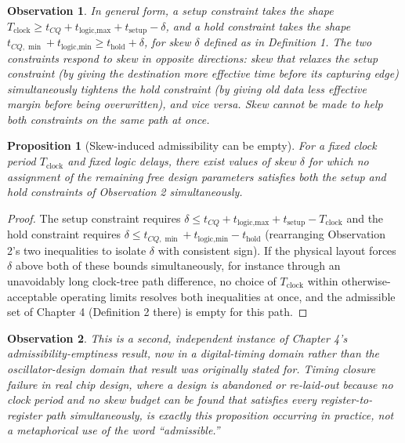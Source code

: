 \documentclass[12pt]{article}
\newtheorem{proposition}{Proposition}
\newtheorem{observation}{Observation}
\begin{document}
\begin{observation}
In general form, a setup constraint takes the shape $T_{\text{clock}} \geq t_{CQ} + t_{\text{logic,max}} + t_{\text{setup}} - \delta$, and a hold constraint takes the shape $t_{CQ,\min} + t_{\text{logic,min}} \geq t_{\text{hold}} + \delta$, for skew $\delta$ defined as in Definition 1. The two constraints respond to skew in opposite directions: skew that relaxes the setup constraint (by giving the destination more effective time before its capturing edge) simultaneously tightens the hold constraint (by giving old data less effective margin before being overwritten), and vice versa. Skew cannot be made to help both constraints on the same path at once.
\end{observation}

\begin{proposition}[Skew-induced admissibility can be empty]
For a fixed clock period $T_{\text{clock}}$ and fixed logic delays, there exist values of skew $\delta$ for which no assignment of the remaining free design parameters satisfies both the setup and hold constraints of Observation 2 simultaneously.
\end{proposition}

\begin{proof}
The setup constraint requires $\delta \leq t_{CQ}+t_{\text{logic,max}}+t_{\text{setup}} - T_{\text{clock}}$ and the hold constraint requires $\delta \leq t_{CQ,\min}+t_{\text{logic,min}} - t_{\text{hold}}$ (rearranging Observation 2's two inequalities to isolate $\delta$ with consistent sign). If the physical layout forces $\delta$ above both of these bounds simultaneously, for instance through an unavoidably long clock-tree path difference, no choice of $T_{\text{clock}}$ within otherwise-acceptable operating limits resolves both inequalities at once, and the admissible set of Chapter 4 (Definition 2 there) is empty for this path.
\end{proof}

\begin{observation}
This is a second, independent instance of Chapter 4's admissibility-emptiness result, now in a digital-timing domain rather than the oscillator-design domain that result was originally stated for. Timing closure failure in real chip design, where a design is abandoned or re-laid-out because no clock period and no skew budget can be found that satisfies every register-to-register path simultaneously, is exactly this proposition occurring in practice, not a metaphorical use of the word ``admissible.''
\end{observation}
\end{document}
